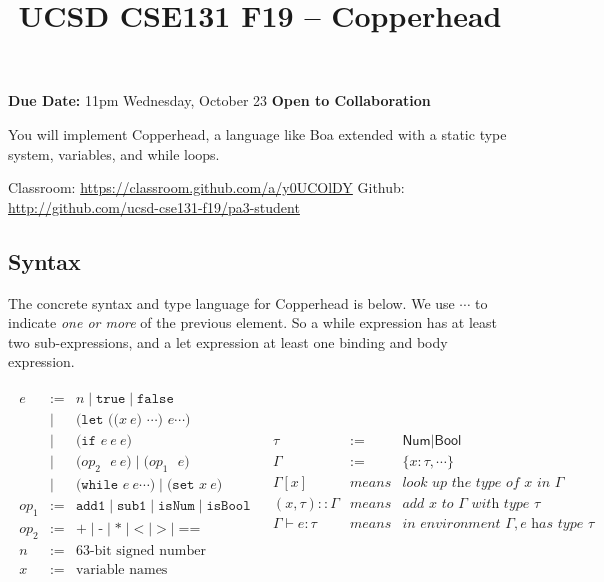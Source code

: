 \documentclass[10pt, oneside]{article}
\title{UCSD CSE131 F19 -- Copperhead}
\begin{document}
\maketitle 

{\bf Due Date:} 11pm Wednesday, October 23 \hspace{2em} {\bf Open to Collaboration}

You will implement Copperhead, a language like Boa extended with a static type
system, variables, and while loops.

Classroom: \url{https://classroom.github.com/a/y0UCOlDY} \hspace{1em} Github: \url{http://github.com/ucsd-cse131-f19/pa3-student}


\subsection*{Syntax}

The concrete syntax and type language for Copperhead is below. We use $\cdots$ to
indicate \textit{one or more} of the previous element. So a while expression has at
least two sub-expressions, and a let expression at least one binding and body
expression.

\[
\begin{array}{ll}
\begin{array}{lrl}
e & := & n \mid \texttt{true} \mid \texttt{false} \\
  & \mid  & \texttt{(let (($x\ e$) $\cdots$) $e \cdots$)} \\
  & \mid  & \texttt{(if $e\ e \ e$)} \\
  & \mid  & \texttt{($op_2$ $e\ e$)} \mid \texttt{($op_1$ $e$)} \\
  & \mid  & \texttt{(while $e\ e \cdots$)} \mid \texttt{(set $x\ e$)} \\
op_1 & := & \texttt{add1} \mid \texttt{sub1} \mid \texttt{isNum} \mid \texttt{isBool} \\
op_2 & := & \texttt{+} \mid \texttt{-} \mid \texttt{*} \mid \texttt{<} \mid \texttt{>} \mid \texttt{==} \\
n & := & \textrm{63-bit signed number literals} \\
x & := & \textrm{variable names} \\
\end{array}
&
\begin{array}{lrl}
\tau & := & \textsf{Num} \mid \textsf{Bool} \\
\Gamma & := & \{x:\tau,\cdots\} \\
\Gamma[x] & \textit{means} & \textit{look up the type of } x \textit{ in } \Gamma \\
(x,\tau)::\Gamma & \textit{means} & \textit{add } x \textit{ to } \Gamma \textit{ with type } \tau \\
\Gamma \vdash e : \tau & \textit{means} & \textit{in environment } \Gamma, e \textit{ has type } \tau \\
\end{array}
\end{array}
\]
\end{document}
